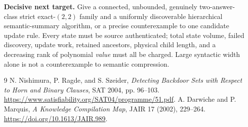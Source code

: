 \documentclass[11pt]{article}
\begin{document}
\textbf{Decisive next target.}  Give a connected, unbounded, genuinely
two-answer-class strict exact-$(2,2)$ family and a uniformly discoverable
hierarchical semantic-summary algorithm, or a precise counterexample to one
candidate update rule.  Every state must be source authenticated; total state
volume, failed discovery, update work, retained ancestors, physical child
length, and a decreasing rank of polynomial \emph{value} must all be charged.
Large syntactic width alone is not a counterexample to semantic compression.

\begin{thebibliography}{9}
 N. Nishimura, P. Ragde, and S. Szeider,
\emph{Detecting Backdoor Sets with Respect to Horn and Binary Clauses},
SAT 2004, pp. 96--103.
\url{https://www.satisfiability.org/SAT04/programme/51.pdf}.
 A. Darwiche and P. Marquis,
\emph{A Knowledge Compilation Map}, JAIR 17 (2002), 229--264.
\url{https://doi.org/10.1613/JAIR.989}.
\end{thebibliography}
\end{document}
